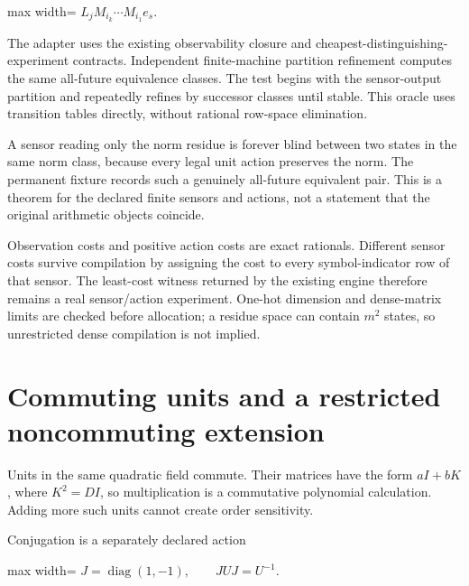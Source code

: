 \documentclass[
  11pt,
  a4paper,
]{report}
\begin{document}
\begin{center}
\begin{adjustbox}{max width=\linewidth}
$\displaystyle
 L_jM_{i_k}\cdots M_{i_1}e_s.
$
\end{adjustbox}
\end{center}

The adapter uses the existing observability closure and
cheapest-distinguishing-experiment contracts. Independent finite-machine
partition refinement computes the same all-future equivalence classes.
The test begins with the sensor-output partition and repeatedly refines
by successor classes until stable. This oracle uses transition tables
directly, without rational row-space elimination.

A sensor reading only the norm residue is forever blind between two
states in the same norm class, because every legal unit action preserves
the norm. The permanent fixture records such a genuinely all-future
equivalent pair. This is a theorem for the declared finite sensors and
actions, not a statement that the original arithmetic objects coincide.

Observation costs and positive action costs are exact rationals.
Different sensor costs survive compilation by assigning the cost to
every symbol-indicator row of that sensor. The least-cost witness
returned by the existing engine therefore remains a real sensor/action
experiment. One-hot dimension and dense-matrix limits are checked before
allocation; a residue space can contain \(m^2\) states, so unrestricted
dense compilation is not implied.

\hypertarget{commuting-units-and-a-restricted-noncommuting-extension}{%
\section{Commuting units and a restricted noncommuting
extension}\label{commuting-units-and-a-restricted-noncommuting-extension}}

Units in the same quadratic field commute. Their matrices have the form
\(aI+bK\), where \(K^2=DI\), so multiplication is a commutative
polynomial calculation. Adding more such units cannot create order
sensitivity.

Conjugation is a separately declared action

\begin{center}
\begin{adjustbox}{max width=\linewidth}
$\displaystyle
 J=\operatorname{diag}(1,-1),\qquad JUJ=U^{-1}.
$
\end{adjustbox}
\end{center}
\end{document}
